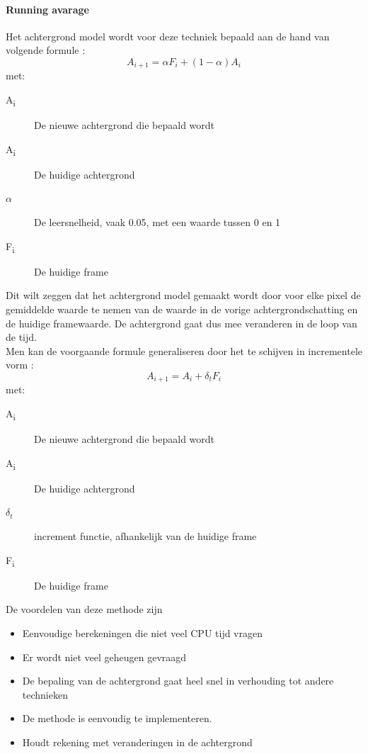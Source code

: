 \paragraph{Running avarage}
\label{refRUA}
Het achtergrond model wordt voor deze techniek bepaald aan de hand van volgende formule \cite{bibBEt}:
\begin{displaymath}
A_{i+1}=\alpha F_i+(1-\alpha)A_i
\end{displaymath}
met:
\begin{description}
	\item[A\textsubscript{i}] De nieuwe achtergrond die bepaald wordt
	\item[A\textsubscript{i}] De huidige achtergrond
	\item[$\alpha$] De leersnelheid, vaak 0.05, met een waarde tussen 0 en 1
	\item[F\textsubscript{i}] De huidige frame
\end{description}
Dit wilt zeggen dat het achtergrond model gemaakt wordt door voor elke pixel de gemiddelde waarde te nemen van de waarde in de vorige achtergrondschatting en de huidige framewaarde. De achtergrond gaat dus mee veranderen in de loop van de tijd. \\
Men kan de voorgaande formule generaliseren door het te schijven in incrementele vorm \cite{bibSDB}:
\begin{displaymath}
A_{i+1}=A_i+\delta_t F_i
\end{displaymath}
met:
\begin{description}
	\item[A\textsubscript{i}] De nieuwe achtergrond die bepaald wordt	
	\item[A\textsubscript{i}] De huidige achtergrond
	\item[$\delta_t$] increment functie, afhankelijk van de huidige frame
	\item[F\textsubscript{i}] De huidige frame
\end{description}
De voordelen van deze methode zijn
\begin{itemize}
	\item Eenvoudige berekeningen die niet veel CPU tijd vragen
	\item Er wordt niet veel geheugen gevraagd
	\item De bepaling van de achtergrond gaat heel snel in verhouding tot andere technieken
	\item De methode is eenvoudig te implementeren.
	\item Houdt rekening met veranderingen in de achtergrond
\end{itemize}

